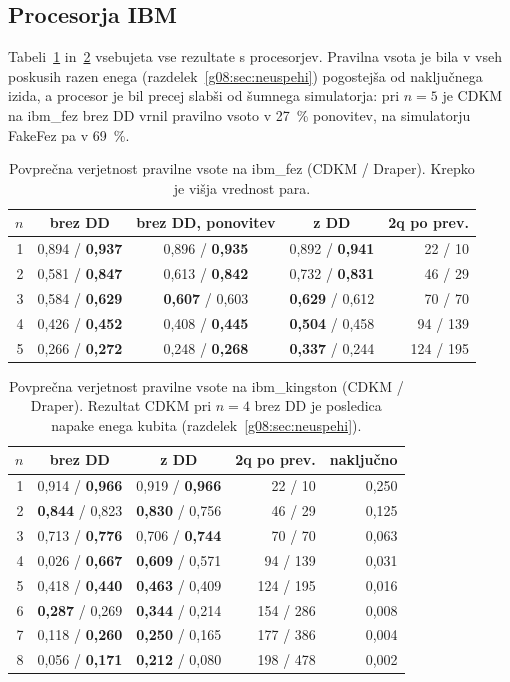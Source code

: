 \subsection{Procesorja IBM}
\label{g08:sec:procesor}

Tabeli~\ref{g08:tab:fez} in~\ref{g08:tab:kingston} vsebujeta vse rezultate s procesorjev. Pravilna vsota je bila v vseh poskusih razen enega (razdelek~\ref{g08:sec:neuspehi}) pogostejša od naključnega izida, a procesor je bil precej slabši od šumnega simulatorja: pri $n = 5$ je CDKM na ibm\_fez brez DD vrnil pravilno vsoto v 27~\% ponovitev, na simulatorju FakeFez pa v 69~\%.

\begin{table}[tbp]
\caption{Povprečna verjetnost pravilne vsote na ibm\_fez (CDKM / Draper). Krepko je višja vrednost para.}
\label{g08:tab:fez}
\centering
\small
\begin{tabular}{rcccr}
\toprule
$n$ & brez DD & brez DD, ponovitev & z DD & 2q po prev. \\
\midrule
1 & 0,894 / \textbf{0,937} & 0,896 / \textbf{0,935} & 0,892 / \textbf{0,941} & 22 / 10 \\
2 & 0,581 / \textbf{0,847} & 0,613 / \textbf{0,842} & 0,732 / \textbf{0,831} & 46 / 29 \\
3 & 0,584 / \textbf{0,629} & \textbf{0,607} / 0,603 & \textbf{0,629} / 0,612 & 70 / 70 \\
4 & 0,426 / \textbf{0,452} & 0,408 / \textbf{0,445} & \textbf{0,504} / 0,458 & 94 / 139 \\
5 & 0,266 / \textbf{0,272} & 0,248 / \textbf{0,268} & \textbf{0,337} / 0,244 & 124 / 195 \\
\bottomrule
\end{tabular}
\end{table}

\begin{table}[tbp]
\caption{Povprečna verjetnost pravilne vsote na ibm\_kingston (CDKM / Draper). Rezultat CDKM pri $n = 4$ brez DD je posledica napake enega kubita (razdelek~\ref{g08:sec:neuspehi}).}
\label{g08:tab:kingston}
\centering
\small
\begin{tabular}{rccrr}
\toprule
$n$ & brez DD & z DD & 2q po prev. & naključno \\
\midrule
1 & 0,914 / \textbf{0,966} & 0,919 / \textbf{0,966} & 22 / 10 & 0,250 \\
2 & \textbf{0,844} / 0,823 & \textbf{0,830} / 0,756 & 46 / 29 & 0,125 \\
3 & 0,713 / \textbf{0,776} & 0,706 / \textbf{0,744} & 70 / 70 & 0,063 \\
4 & 0,026 / \textbf{0,667} & \textbf{0,609} / 0,571 & 94 / 139 & 0,031 \\
5 & 0,418 / \textbf{0,440} & \textbf{0,463} / 0,409 & 124 / 195 & 0,016 \\
6 & \textbf{0,287} / 0,269 & \textbf{0,344} / 0,214 & 154 / 286 & 0,008 \\
7 & 0,118 / \textbf{0,260} & \textbf{0,250} / 0,165 & 177 / 386 & 0,004 \\
8 & 0,056 / \textbf{0,171} & \textbf{0,212} / 0,080 & 198 / 478 & 0,002 \\
\bottomrule
\end{tabular}
\end{table}

